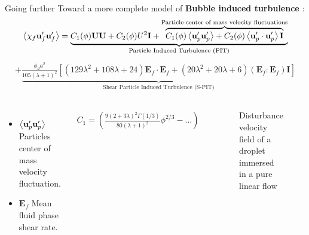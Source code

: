 \documentclass{sintefbeamer}
\begin{document}
\begin{frame}
  {Going further}
  Toward a more complete model of \textbf{Bubble induced turbulence} : 
  \small
  \begin{multline*}
    \left<\chi_f  \textbf{u}_f' \textbf{u}_f'\right>
    =
    \underbrace{
      C_1(\phi)\textbf{UU}
    + C_2(\phi)U^2 \textbf{I}
    + \overbrace{C_1(\phi)\left<\textbf{u}_p'\textbf{u}_p'\right>
    + C_2(\phi)\left<\textbf{u}_{p}'\cdot \textbf{u}_{p}'\right>\textbf{I}
    }^{\text{Particle center of mass velocity fluctuations}}
    }_\text{Particle Induced Turbulence (PIT)}
  \end{multline*}
  \pause
  \begin{multline*}
    + \underbrace{\frac{\phi_d a^2 }{105 (\lambda +1)^2 }\left[
        (129\lambda^2+108\lambda+24)\textbf{E}_f\cdot \textbf{E}_f
        + (20\lambda^2 +20\lambda + 6)
        (\textbf{E}_f : \textbf{E}_f)\textbf{I}
    \right]}_\text{Shear Particle Induced Turbulence (S-PIT)}
\end{multline*}
\begin{columns}
  \begin{itemize}
    \item $\left<\textbf{u}_p'\textbf{u}_p'\right>$ Particles center of mass velocity fluctuation.  
    \item $\textbf{E}_f$ Mean fluid phase shear rate. 
  \end{itemize}
  \begin{align*}
    C_{1} = \left(\frac{9(2+3\lambda)^2 \Gamma(1/3)}{80 (\lambda +1)^2}\phi^{2/3} 
    - \ldots\right)\\
  \end{align*}
  \begin{figure}
    \caption{Disturbance velocity field of a droplet immersed in a pure linear flow}
  \end{figure}
  \includegraphics[width=0.6\textwidth]{image/Shear_Stokes.png}
\end{columns}
\end{frame}
\end{document}
